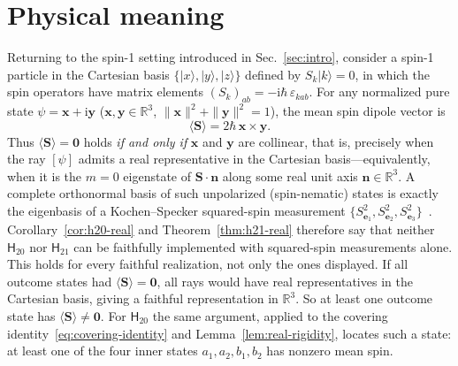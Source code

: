 \documentclass[twocolumn,aps,pra,floatfix,amsmath,amssymb,longbibliography]{revtex4-2}
\newenvironment{handrewrite}{\leavevmode\color{blue}}{}
\theoremstyle{definition}
\theoremstyle{remark}
\newcommand{\ii}{\mathrm{i}}
\newcommand{\R}{\mathbb R}
\newcommand{\Htwenty}{\mathsf H_{20}}
\newcommand{\Htwentyone}{\mathsf H_{21}}
\begin{document}
\section{Physical meaning}
\label{sec:physical}

\begin{handrewrite}
Returning to the spin-1 setting introduced in Sec.~\ref{sec:intro}, consider a
spin-1 particle in the Cartesian basis $\{|x\rangle,|y\rangle,|z\rangle\}$
defined by $S_k|k\rangle=0$, in which the spin operators have matrix elements
$(S_k)_{ab}=-\ii\hbar\,\varepsilon_{kab}$.  For any normalized pure state
$\psi=\mathbf x+\ii\mathbf y$ ($\mathbf x,\mathbf y\in\R^3$,
$\|\mathbf x\|^2+\|\mathbf y\|^2=1$), the mean spin dipole vector
is~\cite{ZiboldEtAl2016SpinNematic}
\begin{equation}
 \langle\mathbf S\rangle=2\hbar\,\mathbf x\times\mathbf y.
 \label{eq:spin-expectation}
\end{equation}
Thus $\langle\mathbf S\rangle=\mathbf 0$ holds \emph{if and only if} $\mathbf x$
and $\mathbf y$ are collinear, that is, precisely when the ray $[\psi]$ admits
a real representative in the Cartesian basis---equivalently, when it is the
$m=0$ eigenstate of $\mathbf S\cdot\mathbf n$ along some real unit axis
$\mathbf n\in\R^3$.  A complete orthonormal basis of such unpolarized
(spin-nematic) states is exactly the eigenbasis of a Kochen--Specker
squared-spin measurement $\{S_{\mathbf e_1}^2,S_{\mathbf e_2}^2,S_{\mathbf e_3}^2\}$~\cite{kochen1}.
Corollary~\ref{cor:h20-real} and Theorem~\ref{thm:h21-real} therefore say
that neither $\Htwenty$ nor $\Htwentyone$ can be faithfully implemented with
squared-spin measurements alone.  This holds for every faithful realization,
not only the ones displayed.  If all outcome states had
$\langle\mathbf S\rangle=\mathbf 0$, all rays would have real
representatives in the Cartesian basis, giving a faithful representation in
$\R^3$.  So at least one outcome state has $\langle\mathbf S\rangle\ne\mathbf 0$.
For $\Htwenty$ the same argument, applied to the covering
identity~\eqref{eq:covering-identity} and Lemma~\ref{lem:real-rigidity}, locates
such a state: at least one of the four inner states $a_1,a_2,b_1,b_2$ has
nonzero mean spin.


\end{handrewrite}
\end{document}
